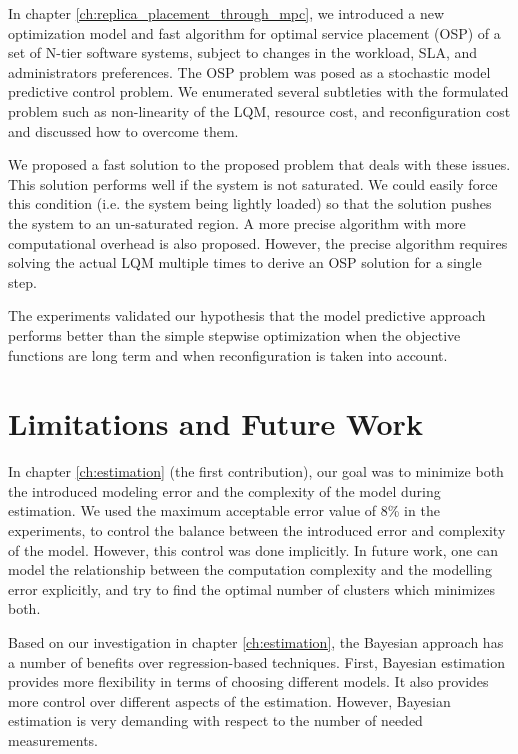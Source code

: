 In  chapter \ref{ch:replica_placement_through_mpc}, we introduced a new optimization model and fast algorithm for optimal service placement (OSP) of a set of N-tier software systems, subject to changes in the workload, SLA, and administrators preferences.
The OSP problem was posed as a stochastic model predictive control problem.
 We enumerated several subtleties with the formulated problem such as non-linearity of the LQM, resource cost, and reconfiguration cost and discussed how to overcome them. 

 We proposed a fast solution to the proposed problem that deals with these issues. This solution performs well if the system is not saturated. We could easily force this condition (i.e. the system being lightly loaded) so that the solution pushes the system to an un-saturated region. A more precise algorithm with more computational overhead is also proposed. However, the precise algorithm requires solving the actual LQM multiple times to derive an OSP solution for a single step.  
	
The experiments validated our hypothesis that the model predictive approach performs better than the simple stepwise optimization when the objective functions are long term and when reconfiguration is taken into account.

\section{Limitations and Future Work}
In chapter \ref{ch:estimation} (the first contribution), our goal was to minimize both the introduced modeling error and the complexity of the model during estimation.
We used the maximum acceptable error value of 8\% in the experiments, to control the balance between the introduced error and complexity of the model. 
However, this control was done implicitly.  
In future work, one can model the relationship between the computation complexity and the modelling error explicitly, and try to find the optimal number of clusters which minimizes both.  

Based on our investigation in chapter \ref{ch:estimation}, the Bayesian approach has a number of benefits over regression-based techniques. First, Bayesian estimation provides more flexibility in terms of choosing different models. It also provides more control over different aspects of the estimation. However, Bayesian estimation is very demanding with respect to the number of needed measurements.

